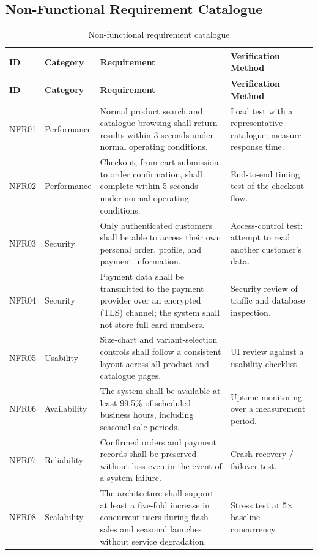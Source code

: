 \documentclass[11pt,a4paper,oneside]{extreport}
\begin{document}
\subsection{Non-Functional Requirement Catalogue}
{\small
\begin{xltabular}{\textwidth}{@{}l L{1.9cm} Y L{3.6cm}@{}}
\caption{Non-functional requirement catalogue}\label{tab:nfr}\\
\toprule
\textbf{ID} & \textbf{Category} & \textbf{Requirement} & \textbf{Verification Method} \\ \midrule
\endfirsthead
\toprule
\textbf{ID} & \textbf{Category} & \textbf{Requirement} & \textbf{Verification Method} \\ \midrule
\endhead
\bottomrule
\endlastfoot
NFR01 & Performance & Normal product search and catalogue browsing shall return results within 3 seconds under normal operating conditions. & Load test with a representative catalogue; measure response time. \\
NFR02 & Performance & Checkout, from cart submission to order confirmation, shall complete within 5 seconds under normal operating conditions. & End-to-end timing test of the checkout flow. \\
NFR03 & Security & Only authenticated customers shall be able to access their own personal order, profile, and payment information. & Access-control test: attempt to read another customer's data. \\
NFR04 & Security & Payment data shall be transmitted to the payment provider over an encrypted (TLS) channel; the system shall not store full card numbers. & Security review of traffic and database inspection. \\
NFR05 & Usability & Size-chart and variant-selection controls shall follow a consistent layout across all product and catalogue pages. & UI review against a usability checklist. \\
NFR06 & Availability & The system shall be available at least 99.5\% of scheduled business hours, including seasonal sale periods. & Uptime monitoring over a measurement period. \\
NFR07 & Reliability & Confirmed orders and payment records shall be preserved without loss even in the event of a system failure. & Crash-recovery / failover test. \\
NFR08 & Scalability & The architecture shall support at least a five-fold increase in concurrent users during flash sales and seasonal launches without service degradation. & Stress test at 5$\times$ baseline concurrency. \\

\end{xltabular}}
\end{document}
